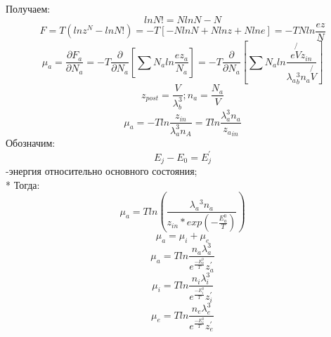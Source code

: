 \documentclass[letterpaper,12pt]{article}
\begin{document}
Получаем:
\begin{equation} \label{eq:aperp} %
ln{N!}=NlnN-N 
\end{equation}
\begin{equation} \label{eq:aperp} %
F=T(ln{z^N} - ln{N!})=-T[-NlnN + Nlnz + Nln{e}]= - TNln{\frac{ez}{N}}
\end{equation}
 \begin{equation} \label{eq:aperp} %
\mu_{a}=\frac{\partial F_a}{\partial N_a}=-T \frac{\partial}{\partial N_a}[\sum N_a ln{\frac{ez_a}{N_a}}]=-T\frac{\partial}{\partial N_a}[\sum N_a ln{\frac{e \not{V} z_{in}}{\lambda{_a}^3_{b}n_a \not{V} }}] 
\end{equation}
\begin{equation} \label{eq:aperp} %
z_{post}=\frac{V}{\lambda^3_{b}}; n_a=\frac{N_a}{V} 
\end{equation}
\begin{equation} \label{eq:aperp} %
\mu_a=-T ln{\frac{z_{in}}{\lambda^3_a n_A}}= T ln{\frac{\lambda^3_a n_a}{z{_a}_{in}}} 
\end{equation}
Обозначим:
\begin{equation} \label{eq:aperp} %
E_{j}-E_{0}=E_{j}^{'}
\end{equation} -энергия относительно основного состояния;
\\*
Тогда:
\begin{equation} \label{eq:aperp} %
\mu_a = Tln(\frac{\lambda{_a}^3 n_a}{z_{in}*exp(- \frac{E_{a}^{0}}{T})})
\end{equation}
\begin{equation} \label{eq:aperp} %
\mu_{a}=\mu_{i} + \mu_{e} 
\end{equation}
\begin{equation} \label{eq:aperp} %
\mu_{a}=Tln{\frac{n_a \lambda_{a}^{3}}{e^{\frac{-E_{a}^{0}}{T}}z_{a}^{'}}} 
\end{equation}
\begin{equation} \label{eq:aperp} %
\mu_{i}=Tln{\frac{n_i \lambda_{i}^{3}}{e^{\frac{-E_{i}^{0}}{T}}z_{i}^{'}}}
\end{equation}
\begin{equation} \label{eq:aperp} %
\mu_{e}=Tln{\frac{n_e \lambda_{e}^{3}}{e^{\frac{-E_{e}^{0}}{T}}z_{e}^{'}}}
\end{equation}
\end{document}
